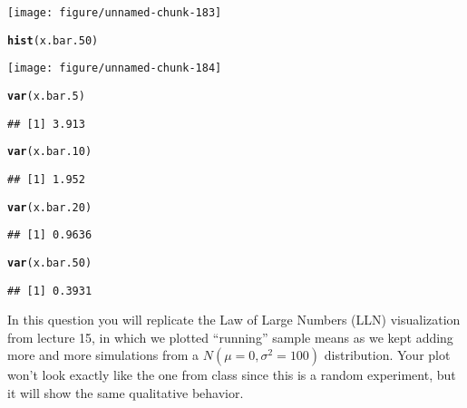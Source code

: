 \documentclass[addpoints,12pt]{exam}\usepackage[]{graphicx}\usepackage[]{color}
\makeatletter
\def\maxwidth{ %
  \ifdim\Gin@nat@width>\linewidth
    \linewidth
  \else
    \Gin@nat@width
  \fi
}
\newcommand{\hlstd}[1]{\textcolor[rgb]{0.345,0.345,0.345}{#1}}%
\newcommand{\hlkwd}[1]{\textcolor[rgb]{0.737,0.353,0.396}{\textbf{#1}}}%
\newenvironment{kframe}{%
 \def\at@end@of@kframe{}%
 \ifinner\ifhmode%
  \def\at@end@of@kframe{\end{minipage}}%
  \begin{minipage}{\columnwidth}%
 \fi\fi%
 \def\FrameCommand##1{\hskip\@totalleftmargin \hskip-\fboxsep
 \colorbox{shadecolor}{##1}\hskip-\fboxsep
     \hskip-\linewidth \hskip-\@totalleftmargin \hskip\columnwidth}%
 \MakeFramed {\advance\hsize-\width
   \@totalleftmargin\z@ \linewidth\hsize
   \@setminipage}}%
 {\par\unskip\endMakeFramed%
 \at@end@of@kframe}
\newenvironment{knitrout}{}{} %
\makeatother
\begin{document}
\begin{questions}
\begin{parts}
\begin{solution}
\begin{knitrout}
{\centering \texttt{[image: figure/unnamed-chunk-183]} 

}


\begin{kframe}\begin{alltt}
\hlkwd{hist}\hlstd{(x.bar.50)}
\end{alltt}
\end{kframe}

{\centering \texttt{[image: figure/unnamed-chunk-184]} 

}


\begin{kframe}\begin{alltt}
\hlkwd{var}\hlstd{(x.bar.5)}
\end{alltt}
\begin{verbatim}
## [1] 3.913
\end{verbatim}
\begin{alltt}
\hlkwd{var}\hlstd{(x.bar.10)}
\end{alltt}
\begin{verbatim}
## [1] 1.952
\end{verbatim}
\begin{alltt}
\hlkwd{var}\hlstd{(x.bar.20)}
\end{alltt}
\begin{verbatim}
## [1] 0.9636
\end{verbatim}
\begin{alltt}
\hlkwd{var}\hlstd{(x.bar.50)}
\end{alltt}
\begin{verbatim}
## [1] 0.3931
\end{verbatim}
\end{kframe}
\end{knitrout}
\end{solution}
	\end{parts}
\question In this question you will replicate the Law of Large Numbers (LLN) visualization from lecture 15, in which we plotted ``running'' sample means as we kept adding more and more simulations from a $N(\mu = 0, \sigma^2 = 100)$ distribution. Your plot won't look exactly like the one from class since this is a random experiment, but it will show the same qualitative behavior.
    \begin{parts}

\end{parts}
\end{questions}
\end{document}
